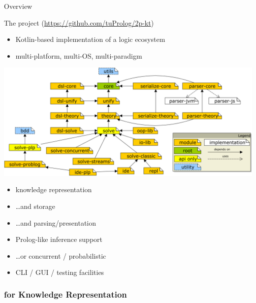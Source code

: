 \documentclass[presentation]{beamer}\mode<presentation>{\usetheme{AMSBolognaFC}}
\begin{document}
\begin{frame}{Overview}
    \begin{block}{The \twopkt{} project \hfill (\url{https://github.com/tuProlog/2p-kt})}
        \begin{itemize}
            \item Kotlin-based implementation of a logic ecosystem
            \item multi-platform, multi-OS, multi-paradigm
        \end{itemize}
    \end{block} 

    \begin{center}
        \includegraphics[width=.7\linewidth]{figures/project-map.png}    
    \end{center}

    \begin{multicols}{2}
        \begin{itemize}\small
            \item knowledge representation
            
            \item \ldots and storage
            
            \item \ldots and parsing/presentation

            \item Prolog-like inference support
            \item \ldots or concurrent / probabilistic
            
            \item CLI / GUI / testing facilities
        \end{itemize}
    \end{multicols}
\end{frame}

\subsubsection{\twopkt{} for Knowledge Representation}
\end{document}
